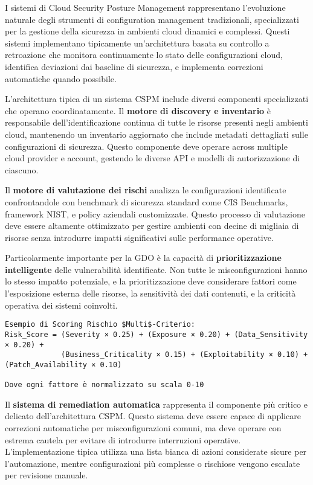 {I sistemi di Cloud Security Posture Management rappresentano l'evoluzione naturale degli strumenti di configuration management tradizionali, specializzati per la gestione della sicurezza in ambienti cloud dinamici e complessi. Questi sistemi implementano tipicamente un'architettura basata su controllo a retroazione che monitora continuamente lo stato delle configurazioni cloud, identifica deviazioni dai baseline di sicurezza, e implementa correzioni automatiche quando possibile.

L'architettura tipica di un sistema CSPM include diversi componenti specializzati che operano coordinatamente. Il \textbf{motore di discovery e inventario} è responsabile dell'identificazione continua di tutte le risorse presenti negli ambienti cloud, mantenendo un inventario aggiornato che include metadati dettagliati sulle configurazioni di sicurezza. Questo componente deve operare across multiple cloud provider e account, gestendo le diverse API e modelli di autorizzazione di ciascuno.

Il \textbf{motore di valutazione dei rischi} analizza le configurazioni identificate confrontandole con benchmark di sicurezza standard come CIS Benchmarks, framework NIST, e policy aziendali customizzate. Questo processo di valutazione deve essere altamente ottimizzato per gestire ambienti con decine di migliaia di risorse senza introdurre impatti significativi sulle performance operative.

Particolarmente importante per la GDO è la capacità di \textbf{prioritizzazione intelligente} delle vulnerabilità identificate. Non tutte le misconfigurazioni hanno lo stesso impatto potenziale, e la prioritizzazione deve considerare fattori come l'esposizione esterna delle risorse, la sensitività dei dati contenuti, e la criticità operativa dei sistemi coinvolti.

\begin{verbatim}
Esempio di Scoring Rischio $Multi$-Criterio:
Risk_Score = (Severity × 0.25) + (Exposure × 0.20) + (Data_Sensitivity × 0.20) + 
             (Business_Criticality × 0.15) + (Exploitability × 0.10) + (Patch_Availability × 0.10)

Dove ogni fattore è normalizzato su scala 0-10
\end{verbatim}

Il \textbf{sistema di remediation automatica} rappresenta il componente più critico e delicato dell'architettura CSPM. Questo sistema deve essere capace di applicare correzioni automatiche per misconfigurazioni comuni, ma deve operare con estrema cautela per evitare di introdurre interruzioni operative. L'implementazione tipica utilizza una lista bianca di azioni considerate sicure per l'automazione, mentre configurazioni più complesse o rischiose vengono escalate per revisione manuale.

}
